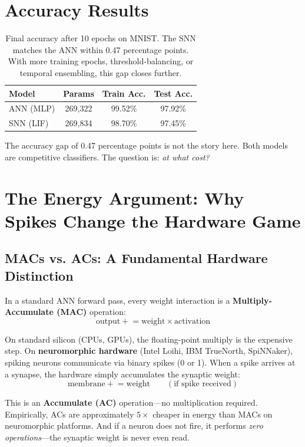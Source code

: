 \documentclass[12pt]{article}
\begin{document}
\section*{Accuracy Results}

\begin{table}[h]
\centering
\begin{tabular}{@{}lccc@{}}
\toprule
\textbf{Model} & \textbf{Params} & \textbf{Train Acc.} & \textbf{Test Acc.} \\
\midrule
ANN (MLP) & 269,322 & 99.52\% & 97.92\% \\
SNN (LIF) & 269,834 & 98.70\% & 97.45\% \\
\bottomrule
\end{tabular}
\caption{Final accuracy after 10 epochs on MNIST. The SNN matches the ANN within 0.47 percentage points. With more training epochs, threshold-balancing, or temporal ensembling, this gap closes further.}
\end{table}

The accuracy gap of 0.47 percentage points is not the story here. Both models are competitive classifiers. The question is: \textit{at what cost?}

\section*{The Energy Argument: Why Spikes Change the Hardware Game}

\subsection*{MACs vs. ACs: A Fundamental Hardware Distinction}
In a standard ANN forward pass, every weight interaction is a \textbf{Multiply-Accumulate (MAC)} operation:
\begin{equation}
    \text{output} \mathrel{+}= \text{weight} \times \text{activation}
\end{equation}

On standard silicon (CPUs, GPUs), the floating-point multiply is the expensive step. On \textbf{neuromorphic hardware} (Intel Loihi, IBM TrueNorth, SpiNNaker), spiking neurons communicate via binary spikes (0 or 1). When a spike arrives at a synapse, the hardware simply accumulates the synaptic weight:
\begin{equation}
    \text{membrane} \mathrel{+}= \text{weight} \qquad (\text{if spike received})
\end{equation}

This is an \textbf{Accumulate (AC)} operation—no multiplication required. Empirically, ACs are approximately $5\times$ cheaper in energy than MACs on neuromorphic platforms. And if a neuron does not fire, it performs \textit{zero operations}—the synaptic weight is never even read.
\end{document}
